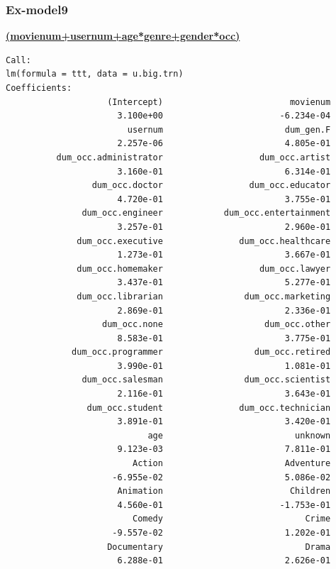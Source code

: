 \documentclass[11pt]{article}
\begin{document}
\subsubsection{Ex-model9}
\textbf{\underline{(movienum+usernum+age*genre+gender*occ)}}
\begin{verbatim}
Call:
lm(formula = ttt, data = u.big.trn)
Coefficients:
                    (Intercept)                         movienum  
                      3.100e+00                       -6.234e-04  
                        usernum                        dum_gen.F  
                      2.257e-06                        4.805e-01  
          dum_occ.administrator                   dum_occ.artist  
                      3.160e-01                        6.314e-01  
                 dum_occ.doctor                 dum_occ.educator  
                      4.720e-01                        3.755e-01  
               dum_occ.engineer            dum_occ.entertainment  
                      3.257e-01                        2.960e-01  
              dum_occ.executive               dum_occ.healthcare  
                      1.273e-01                        3.667e-01  
              dum_occ.homemaker                   dum_occ.lawyer  
                      3.437e-01                        5.277e-01  
              dum_occ.librarian                dum_occ.marketing  
                      2.869e-01                        2.336e-01  
                   dum_occ.none                    dum_occ.other  
                      8.583e-01                        3.775e-01  
             dum_occ.programmer                  dum_occ.retired  
                      3.990e-01                        1.081e-01  
               dum_occ.salesman                dum_occ.scientist  
                      2.116e-01                        3.643e-01  
                dum_occ.student               dum_occ.technician  
                      3.891e-01                        3.420e-01  
                            age                          unknown  
                      9.123e-03                        7.811e-01  
                         Action                        Adventure  
                     -6.955e-02                        5.086e-02  
                      Animation                         Children  
                      4.560e-01                       -1.753e-01  
                         Comedy                            Crime  
                     -9.557e-02                        1.202e-01  
                    Documentary                            Drama  
                      6.288e-01                        2.626e-01  

\end{verbatim}
\end{document}

